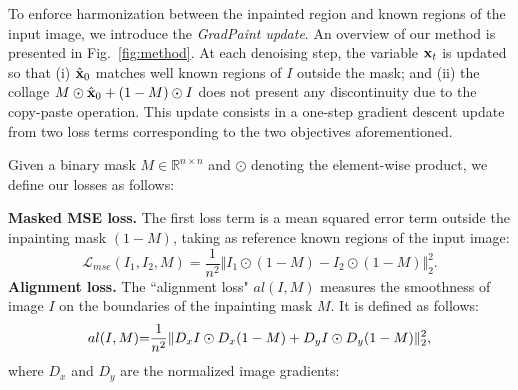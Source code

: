 To enforce harmonization between the inpainted region and known regions of the input image, we introduce the 
\textit{GradPaint update}. An overview of our method is presented in Fig.~\ref{fig:method}.
At each denoising step, the variable $\mathbf{x}_t$ is updated so that (i) $\hat{\mathbf{x}}_0$ matches well known regions of 
$I$ outside the mask; and (ii) the collage $M \odot \hat{\mathbf{x}}_0 + (1-M) \odot I$ does not present any discontinuity 
due to the copy-paste operation. This update consists in a one-step gradient descent update from two loss terms
 corresponding to the two objectives aforementioned.




Given a binary mask $M \in \mathbb{R}^{n \times n}$ and $\odot$ denoting the element-wise product, we define our losses as follows:

\noindent \textbf{Masked MSE loss.} The first loss term is a mean squared error term outside the inpainting mask $(1 - M)$, taking as reference known regions of the input image:
\begin{equation}
    \mathcal{L}_{mse}(I_1, I_2, M) = \frac{1}{n^2}\Vert I_1 \odot (1 - M) - I_2 \odot (1 - M) \Vert_2^2. 
\end{equation}
\noindent \textbf{Alignment loss.} The ``alignment loss" $al(I, M)$ measures the smoothness of image $I$ on the boundaries of the inpainting mask $M$. It is defined as follows:
\vspace*{-.1cm}\begin{equation}
    al(I, M) \hspace{-0.1cm}=  \hspace{-0.1cm} \frac{1}{n^2}\Vert D_x I \odot D_x (1 - M) +D_y I \odot D_y (1 - M) \Vert_2^2, 
\end{equation}
where $D_x$ and $D_y$ are the normalized image gradients:

